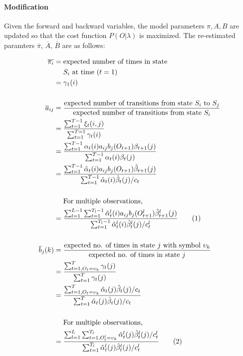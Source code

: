 \documentclass[letterpaper, 10 pt, conference]{ieeeconf}  %
\newcommand\numberthis{\addtocounter{equation}{1}\tag{\theequation}}
\begin{document}
\paragraph{Modification}
Given the forward and backward variables, the model parameters ${\pi, A, B}$ are updated so that the cost function $P(O|\lambda)$ is maximized. The re-estimated paramters {$\overline{\pi}$, $\overline{A}$, $\overline{B}$} are as follows:

\begin{align*}
	\overline{\pi_i} =&\; \text{expected number of times in state}\\
					&\; S_i \text{ at time } (t = 1)  \\
	=&\; \gamma_1(i) \\ \\
	\overline{a}_{ij} =&\; \frac{\text{expected number of transitions from state }S_i \text{ to } S_j}{\text{expected number of transitions from state }S_i} \\
	=&\; \frac{\sum_{t=1}^{T-1} \xi_t(i,j)}{\sum_{t=1}^{T=1}\gamma_t(i)} \\
	=&\; \frac{\sum_{t=1}^{T-1} \alpha_t(i) a_{ij} b_{j}(O_{t+1}) \beta_{t+1}(j)}{\sum_{t=1}^{T-1} \alpha_t(i) \beta_{t}(j) } \\
	=&\; \frac{\sum_{t=1}^{T-1} \hat{\alpha}_t(i) a_{ij} b_{j}(O_{t+1}) \hat{\beta}_{t+1}(j)}{\sum_{t=1}^{T-1} \hat{\alpha}_t(i) \hat{\beta}_{t}(j) / c_t } \\ \\
	&\; \text{For multiple observations, }\\
	=&\; \frac{\sum_{l=1}^{L-1} \sum_{t=1}^{T_l-1} \hat{\alpha}_t^{l}(i) a_{ij} b_{j}(O_{t+1}^{l}) \hat{\beta}_{t+1}^{l}(j)}{\sum_{t=1}^{T_l-1} \hat{\alpha}_t^{l}(i) \hat{\beta}_{t}^{l}(j) / c_t^{l} } \numberthis \\ \\
	\overline{b}_j(k) =&\; \frac{\text{expected no. of times in state } j \text{ with symbol }\upsilon_k}{\text{expected no. of times in state }j} \\
	=&\; \frac{\sum_{t=1, O_t=\upsilon_k}^{T} \gamma_t(j)}{\sum_{t=1}^{T} \gamma_t(j)} \\
	=&\; \frac{\sum_{t=1, O_t=\upsilon_k}^{T} \hat{\alpha}_t(j) \hat{\beta}_t(j) / c_t}{\sum_{t=1}^{T} \hat{\alpha}_t(j) \hat{\beta}_t(j) / c_t} \\ \\
	&\; \text{For multiple observations, } \\
	=&\;  \frac{\sum_{l=1}^{L} \sum_{t=1, O_t^{l}=\upsilon_k}^{T_l} \hat{\alpha}_t^{l}(j) \hat{\beta}_t^{l}(j) / c_t^{l}}{\sum_{t=1}^{T_l} \hat{\alpha}_t^{l}(j) \hat{\beta}_t^{l}(j) / c_t^{l}} \numberthis \\
\end{align*}
\end{document}
